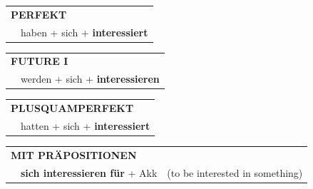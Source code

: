 \documentclass[10pt,a4paper]{revtex4-2}
\begin{document}
\begin{verbbox}
    \vspace{10pt}

 \begin{tabular}{rl}
     \multicolumn{2}{l}{\textbf{PERFEKT}}\\
   & haben + sich + \textbf{interessiert}\\
  \end{tabular}
\hfill
   \begin{tabular}{rl}
    \multicolumn{2}{l}{\textbf{FUTURE I} }\\
    &werden + sich + \textbf{interessieren}\\
  \end{tabular}
\hfill
   \begin{tabular}{rl}
      \multicolumn{2}{l}{\textbf{PLUSQUAMPERFEKT}}\\
   & hatten + sich + \textbf{interessiert}\\
  \end{tabular}
  
\vspace{10pt}

   \begin{tabular}{lll}
      \multicolumn{3}{l}{\textbf{MIT PRÄPOSITIONEN}}\\
& \textbf{sich interessieren für} + Akk & (to be interested in something)\\
  \end{tabular}

  \vspace{-5pt}

\end{verbbox}
\end{document}
